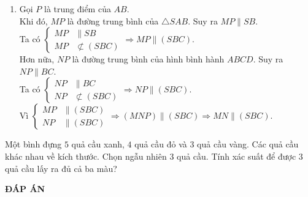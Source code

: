 \begin{bt}
{\begin{enumerate}
{
			}
			\item Gọi $P$ là trung điểm của $AB$.\\
			Khi đó, $MP$ là đường trung bình của $\triangle SAB$. Suy ra $MP\parallel SB$.\\
			Ta có $\left\{\begin{aligned}MP&\parallel SB\\MP&\not\subset (SBC)\end{aligned}\right.\Rightarrow MP\parallel (SBC)$.\\
			Hơn nữa, $NP$ là đường trung bình của hình bình hành $ABCD$. Suy ra $NP\parallel BC$.\\
			Ta có $\left\{\begin{aligned}NP&\parallel BC\\NP&\not\subset (SBC)\end{aligned}\right.\Rightarrow NP\parallel (SBC)$.\\
			Vì $\left\{\begin{aligned}MP&\parallel (SBC)\\NP&\parallel (SBC)\end{aligned}\right.\Rightarrow (MNP)\parallel (SBC)\Rightarrow MN \parallel (SBC)$.
			\end{enumerate}	
	}
\end{bt}
\begin{bt}%
	Một bình đựng $5$ quả cầu xanh, $4$ quả cầu đỏ và $3$ quả cầu vàng. Các quả cầu khác nhau về kích thước. Chọn ngẫu nhiên $3$ quả cầu. Tính xác suất để được $3$ quả cầu lấy ra đủ cả ba màu?
\end{bt}

\newpage
\begin{center}
	\textbf{ĐÁP ÁN}
\end{center}
\begin{multicols}{10}
	
\end{multicols}
